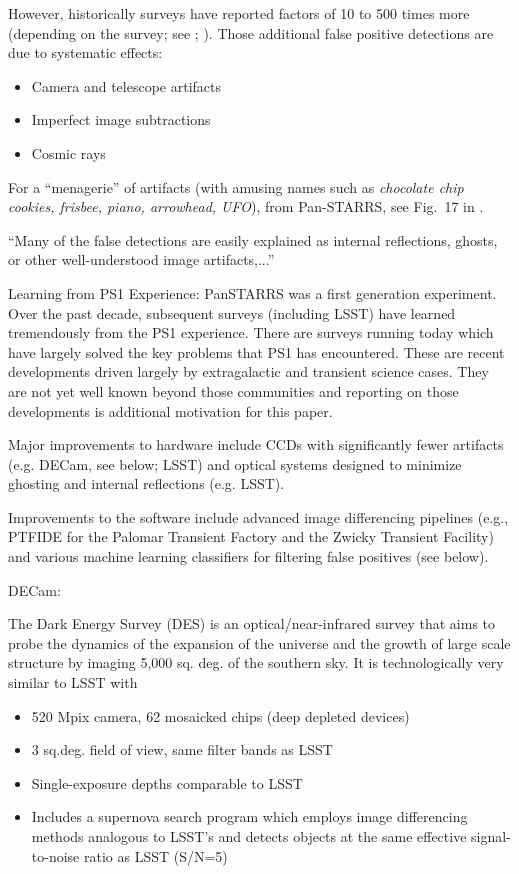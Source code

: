 However, historically surveys have reported factors of 10 to 500 times
more (depending on the survey; see \citep{denneau13};
\citep{goldstein15} ). 
Those additional false positive
detections are due to systematic effects: 
\begin{itemize} 
\item Camera and telescope artifacts
\item Imperfect image subtractions
\item Cosmic rays
\end{itemize} 

For a ``menagerie'' of artifacts (with amusing names such as 
{\it chocolate chip cookies, frisbee, piano, arrowhead, UFO}), from
Pan-STARRS, see Fig.~17 in \cite{denneau13}. 


``Many of the false detections are easily explained as internal
reflections, ghosts, or other well-understood image artifacts,...''


Learning from PS1 Experience: PanSTARRS was a first generation
experiment. Over the past decade, subsequent surveys (including LSST) 
have learned tremendously from the PS1 experience. There are surveys 
running today which have largely solved the key problems that PS1 has encountered.
These are recent developments driven largely by extragalactic and
transient science cases. They are not yet well known beyond those
communities and reporting on those developments is additional
motivation for this paper. 
 
Major improvements to hardware include CCDs with significantly fewer 
artifacts (e.g. DECam, see below; LSST) and optical systems designed to
minimize ghosting and internal reflections (e.g. LSST). 

Improvements to the software include advanced image differencing
pipelines (e.g., PTFIDE for the Palomar Transient Factory and the
Zwicky Transient Facility) and various machine learning classifiers
for filtering false positives (see below). 

DECam: \cite{goldstein15} 

The Dark Energy Survey (DES) is an optical/near-infrared survey that
aims to probe the dynamics of the expansion of the universe and the
growth of large scale structure by imaging 5,000 sq. deg. of the
southern sky. It is technologically very similar to LSST with
\begin{itemize}
\item 520 Mpix camera, 62 mosaicked chips (deep depleted devices)
\item 3 sq.deg. field of view, same filter bands as LSST
\item Single-exposure depths comparable to LSST
\item Includes a supernova search program which employs image
differencing methods analogous to LSST’s  and detects objects at the 
same effective signal-to-noise ratio as LSST (S/N=5)
\end{itemize} 

